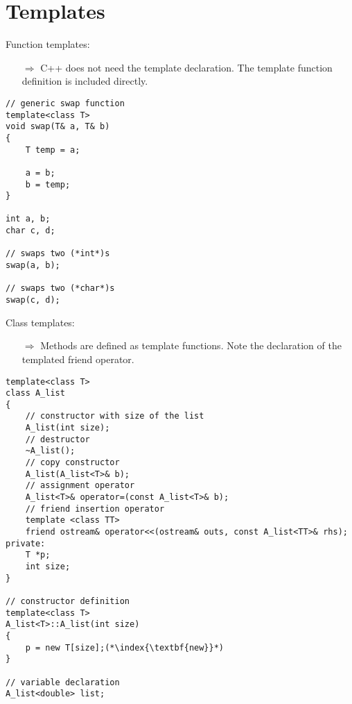 \documentclass[10pt]{article}
\begin{document}
\section{Templates}
\small
Function templates:
\begin{enumerate}
\item[$\Rightarrow$] C++ does not need the template declaration.
The template function definition is included directly.
\end{enumerate}
\begin{lstlisting}
// generic swap function
template<class T>
void swap(T& a, T& b)
{
    T temp = a;
    
    a = b;
    b = temp;
}

int a, b;
char c, d;

// swaps two (*int*)s
swap(a, b);

// swaps two (*char*)s
swap(c, d);
\end{lstlisting}
Class templates:
\begin{enumerate}
\item[$\Rightarrow$] Methods are defined as template functions.
Note the declaration of the templated friend operator.
\end{enumerate}
\begin{lstlisting}
template<class T>
class A_list
{
    // constructor with size of the list
    A_list(int size);
    // destructor
    ~A_list();
    // copy constructor
    A_list(A_list<T>& b);
    // assignment operator
    A_list<T>& operator=(const A_list<T>& b);
    // friend insertion operator
    template <class TT>
    friend ostream& operator<<(ostream& outs, const A_list<TT>& rhs);
private:
    T *p;
    int size;
}

// constructor definition
template<class T>
A_list<T>::A_list(int size)
{
    p = new T[size];(*\index{\textbf{new}}*)
}

// variable declaration
A_list<double> list;
\end{lstlisting}
%
%
\end{document}
